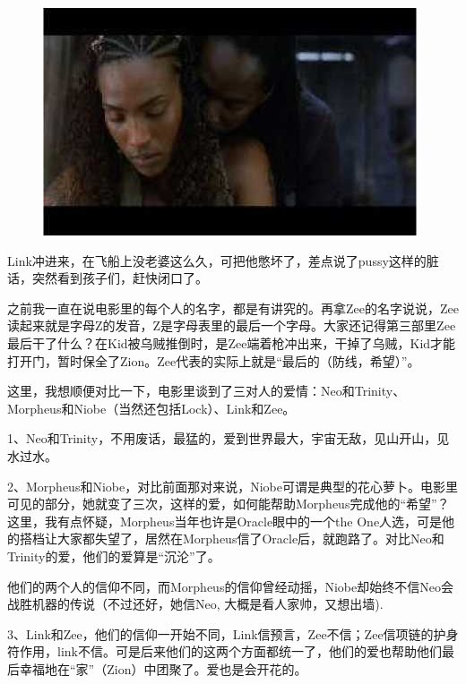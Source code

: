 \documentclass{ctexart}
\begin{document}
\begin{figure}[htb]
\centering
\includegraphics[width=0.5\linewidth]{fig/read_reloaded-39}
\end{figure}

Link冲进来，在飞船上没老婆这么久，可把他憋坏了，差点说了pussy这样的脏话，突然看到孩子们，赶快闭口了。

之前我一直在说电影里的每个人的名字，都是有讲究的。再拿Zee的名字说说，Zee读起来就是字母Z的发音，Z是字母表里的最后一个字母。大家还记得第三部里Zee最后干了什么？在Kid被乌贼推倒时，是Zee端着枪冲出来，干掉了乌贼，Kid才能打开门，暂时保全了Zion。Zee代表的实际上就是“最后的（防线，希望）”。

这里，我想顺便对比一下，电影里谈到了三对人的爱情：Neo和Trinity、Morpheus和Niobe（当然还包括Lock）、Link和Zee。

1、Neo和Trinity，不用废话，最猛的，爱到世界最大，宇宙无敌，见山开山，见水过水。

2、Morpheus和Niobe，对比前面那对来说，Niobe可谓是典型的花心萝卜。电影里可见的部分，她就变了三次，这样的爱，如何能帮助Morpheus完成他的“希望”？这里，我有点怀疑，Morpheus当年也许是Oracle眼中的一个the One人选，可是他的搭档让大家都失望了，居然在Morpheus信了Oracle后，就跑路了。对比Neo和Trinity的爱，他们的爱算是“沉沦”了。

他们的两个人的信仰不同，而Morpheus的信仰曾经动摇，Niobe却始终不信Neo会战胜机器的传说（不过还好，她信Neo, 大概是看人家帅，又想出墙).

3、Link和Zee，他们的信仰一开始不同，Link信预言，Zee不信；Zee信项链的护身符作用，link不信。可是后来他们的这两个方面都统一了，他们的爱也帮助他们最后幸福地在“家”（Zion）中团聚了。爱也是会开花的。
\end{document}

